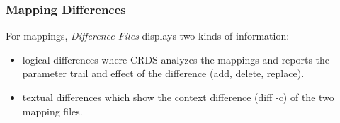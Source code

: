 \documentclass[letterpaper,10pt,english]{sphinxmanual}
\begin{document}
\subsubsection{Mapping Differences}
\label{web_site_use:mapping-differences}
For mappings,  \emph{Difference Files} displays two kinds of information:
\begin{figure}[htbp]
\centering

\end{figure}
\begin{itemize}
\item {} 
logical differences where CRDS analyzes the mappings and reports the
parameter trail and effect of the difference (add, delete, replace).

\end{itemize}
\begin{figure}[htbp]
\centering

\end{figure}
\begin{itemize}
\item {} 
textual differences which show the context difference (diff -c) of the
two mapping files.

\end{itemize}
\end{document}
